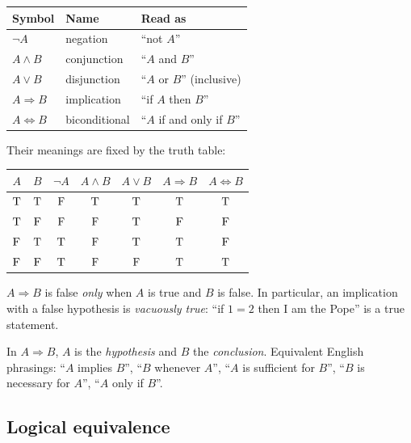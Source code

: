 \begin{center}
\begin{tabular}{lll}
\toprule
Symbol & Name & Read as \\
\midrule
$\neg A$ & negation & ``not $A$'' \\
$A \wedge B$ & conjunction & ``$A$ and $B$'' \\
$A \vee B$ & disjunction & ``$A$ or $B$'' (inclusive) \\
$A \Rightarrow B$ & implication & ``if $A$ then $B$'' \\
$A \Leftrightarrow B$ & biconditional & ``$A$ if and only if $B$'' \\
\bottomrule
\end{tabular}
\end{center}

Their meanings are fixed by the truth table:

\begin{center}
\begin{tabular}{cc|ccccc}
$A$ & $B$ & $\neg A$ & $A\wedge B$ & $A \vee B$ & $A\Rightarrow B$ & $A\Leftrightarrow B$\\
\hline
$\mathrm{T}$ & $\mathrm{T}$ & $\mathrm{F}$ & $\mathrm{T}$ & $\mathrm{T}$ & $\mathrm{T}$ & $\mathrm{T}$ \\
$\mathrm{T}$ & $\mathrm{F}$ & $\mathrm{F}$ & $\mathrm{F}$ & $\mathrm{T}$ & $\mathrm{F}$ & $\mathrm{F}$ \\
$\mathrm{F}$ & $\mathrm{T}$ & $\mathrm{T}$ & $\mathrm{F}$ & $\mathrm{T}$ & $\mathrm{T}$ & $\mathrm{F}$ \\
$\mathrm{F}$ & $\mathrm{F}$ & $\mathrm{T}$ & $\mathrm{F}$ & $\mathrm{F}$ & $\mathrm{T}$ & $\mathrm{T}$ \\
\end{tabular}
\end{center}

\begin{important}
$A \Rightarrow B$ is false \emph{only} when $A$ is true and $B$ is false. In particular,
an implication with a false hypothesis is \emph{vacuously true}: ``if $1 = 2$ then I am the
Pope'' is a true statement.
\end{important}

In $A \Rightarrow B$, $A$ is the \emph{hypothesis} and $B$ the \emph{conclusion}. Equivalent
English phrasings: ``$A$ implies $B$'', ``$B$ whenever $A$'', ``$A$ is sufficient for $B$'',
``$B$ is necessary for $A$'', ``$A$ only if $B$''.

\subsection{Logical equivalence}

